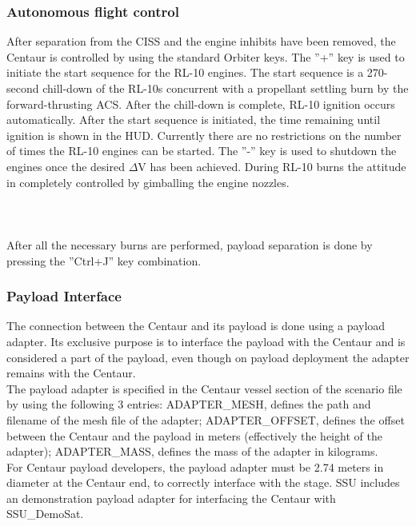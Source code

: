 \documentclass[Space_Shuttle_Ultra_Manual.tex]{subfiles}
\begin{document}
\begin{multicols*}{2}
\subsubsection{Autonomous flight control}
After separation from the CISS and the engine inhibits have been removed, the Centaur is controlled by using the standard Orbiter keys. The ''+'' key is used to initiate the start sequence for the RL-10 engines. The start sequence is a 270-second chill-down of the RL-10s concurrent with a propellant settling burn by the forward-thrusting ACS. After the chill-down is complete, RL-10 ignition occurs automatically. After the start sequence is initiated, the time remaining until ignition is shown in the HUD. Currently there are no restrictions on the number of times the RL-10 engines can be started. The ''-'' key is used to shutdown the engines once the desired $\Delta$V has been achieved. During RL-10 burns the attitude in completely controlled by gimballing the engine nozzles.
\\
\\
\\
\\
After all the necessary burns are performed, payload separation is done by pressing the ''Ctrl+J'' key combination.

\subsubsection{Payload Interface}
The connection between the Centaur and its payload is done using a payload adapter. Its exclusive purpose is to interface the payload with the Centaur and is considered a part of the payload, even though on payload deployment the adapter remains with the Centaur.\\
The payload adapter is specified in the Centaur vessel section of the scenario file by using the following 3 entries: ADAPTER\_MESH, defines the path and filename of the mesh file of the adapter; ADAPTER\_OFFSET, defines the offset between the Centaur and the payload in meters (effectively the height of the adapter); ADAPTER\_MASS, defines the mass of the adapter in kilograms.\\
For Centaur payload developers, the payload adapter must be 2.74 meters in diameter at the Centaur end, to correctly interface with the stage. SSU includes an demonstration payload adapter for interfacing the Centaur with SSU\_DemoSat.

\end{multicols*}
\newpage
\end{document}
